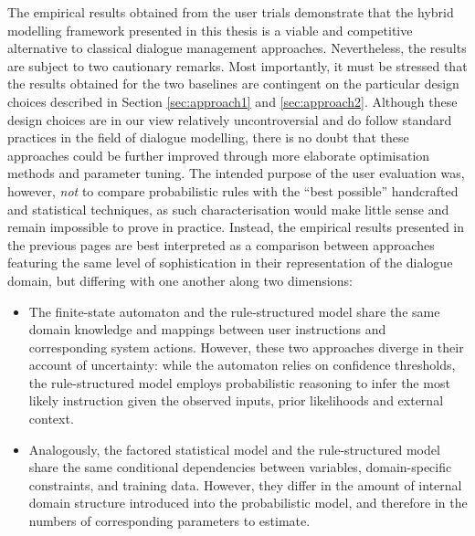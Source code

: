 The empirical results obtained from the user trials demonstrate that the hybrid modelling framework presented in this thesis is a viable and competitive alternative to classical dialogue management approaches.  Nevertheless, the results are subject to two cautionary remarks.  Most importantly, it must be stressed that the results obtained for the two baselines are contingent on the particular design choices described in Section \ref{sec:approach1} and \ref{sec:approach2}.  Although these design choices are in our view relatively uncontroversial and do follow standard practices in the field of dialogue modelling, there is no doubt that these approaches could be further improved through more elaborate optimisation methods and parameter tuning. The intended purpose of the user evaluation was, however, \textit{not} to compare probabilistic rules with the ``best possible'' handcrafted and statistical techniques, as such characterisation would make little sense and remain impossible to prove in practice. Instead, the empirical results presented in the previous pages are best interpreted as a comparison between approaches featuring the same level of sophistication in their representation of the dialogue domain, but differing with one another along two dimensions:
\begin{itemize}
\item The finite-state automaton and the rule-structured model share the same domain knowledge and mappings between user instructions and corresponding system actions.  However, these two approaches diverge in their account of uncertainty: while the automaton relies on confidence thresholds, the rule-structured model employs probabilistic reasoning to infer the most likely instruction given the observed inputs, prior likelihoods and external context.
\item Analogously, the factored statistical model and the rule-structured model share the same conditional dependencies between variables, domain-specific constraints, and training data. However, they differ in the amount of internal domain structure introduced into the probabilistic model, and therefore in the numbers of corresponding parameters to estimate.
\end{itemize}

